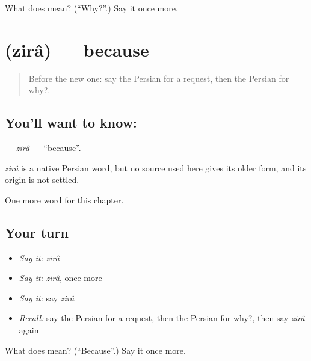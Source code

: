 \begin{tcolorbox}[breakable,colback=teal!4,colframe=teal!35!black,title={Before you move on}]
What does  mean? (\textquotedblleft{}Why?\textquotedblright{}.) Say it once more.
\end{tcolorbox}
\section[\texorpdfstring{\fa{زیرا} (zirâ)}{زیرا (zirâ)}]{ (zirâ) — because}

\label{lesson:FA-C92-zira}



\begin{quote}
Before the new one: say the Persian for a request, then the Persian for why?.
\end{quote}

\subsection*{You'll want to know: }
\textbf{} — \emph{zirâ} — \textquotedblleft{}because\textquotedblright{}.

\begin{cousinweb}
\emph{zirâ} is a native Persian word, but no source used here gives its older form, and its origin is not settled.
\end{cousinweb}

\begin{grammarlens}[title={What you've built}]
One more word for this chapter.
\end{grammarlens}

\subsection*{Your turn}
\begin{itemize}
\raggedright
  \item \emph{Say it:} \emph{zirâ}
  \item \emph{Say it:} \emph{zirâ}, once more
  \item \emph{Say it:} say \emph{zirâ}
  \item \emph{Recall:} say the Persian for a request, then the Persian for why?, then say \emph{zirâ} again
\end{itemize}

\begin{tcolorbox}[breakable,colback=teal!4,colframe=teal!35!black,title={Before you move on}]
What does  mean? (\textquotedblleft{}Because\textquotedblright{}.) Say it once more.
\end{tcolorbox}
